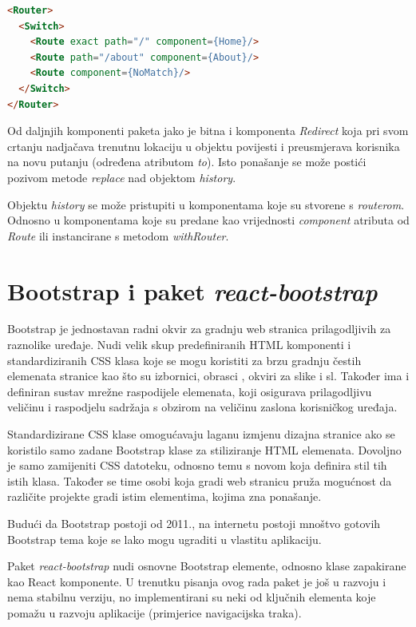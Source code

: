 \documentclass[times, utf8, zavrsni, numeric]{fer}
\newcommand{\razmakp}{\vspace{18pt}}
\newcommand{\razmaks}{\vspace{10pt}}
\begin{document}
\razmakp
\begin{lstlisting}[language=html, caption={Primjer korištenja \emph{Switch}}, label={lst:react_router_switch}]
<Router>
  <Switch>
    <Route exact path="/" component={Home}/>
    <Route path="/about" component={About}/>
    <Route component={NoMatch}/>
  </Switch>
</Router>
\end{lstlisting}
\razmaks

Od daljnjih komponenti paketa jako je bitna i komponenta \emph{Redirect} koja pri svom crtanju nadjačava trenutnu lokaciju u objektu povijesti i preusmjerava korisnika na novu putanju (određena atributom \emph{to}).
Isto ponašanje se može postići pozivom metode \emph{replace} nad objektom \emph{history}.

Objektu \emph{history} se može pristupiti u komponentama koje su \glqq stvorene s \emph{routerom}\grqq .
Odnosno u komponentama koje su predane kao vrijednosti \emph{component} atributa od \emph{Route} ili instancirane s metodom \emph{withRouter}.

\newpage


\section{Bootstrap i paket \emph{react-bootstrap}}

Bootstrap je jednostavan radni okvir za gradnju web stranica prilagodljivih za raznolike uređaje.
Nudi velik skup predefiniranih HTML komponenti i standardiziranih CSS klasa koje se mogu koristiti za brzu gradnju čestih elemenata stranice kao što su izbornici, obrasci , okviri za slike i sl.
Također ima i definiran sustav mrežne raspodijele elemenata, koji osigurava prilagodljivu veličinu i raspodjelu sadržaja s obzirom na veličinu zaslona korisničkog uređaja.

Standardizirane CSS klase omogućavaju laganu izmjenu dizajna stranice ako se koristilo samo zadane Bootstrap klase za stiliziranje HTML elemenata.
Dovoljno je samo zamijeniti CSS datoteku, odnosno temu s novom koja definira stil tih istih klasa.
Također se time osobi koja gradi web stranicu pruža mogućnost da različite projekte gradi istim elementima, kojima zna ponašanje.

Budući da Bootstrap postoji od 2011.\citep{bootstrapWiki}, na internetu postoji mnoštvo gotovih Bootstrap tema koje se lako mogu ugraditi u vlastitu aplikaciju.

\razmakp

Paket \emph{react-bootstrap} nudi osnovne Bootstrap elemente, odnosno klase zapakirane kao React komponente.
U trenutku pisanja ovog rada paket je još u razvoju i nema stabilnu verziju, no implementirani su neki od ključnih elementa koje pomažu u razvoju aplikacije (primjerice navigacijska traka)\citep{bootstrapReact}.
\end{document}
